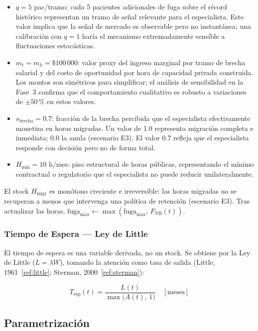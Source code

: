 \documentclass[12pt,a4paper]{article}
\begin{document}
\begin{itemize}[leftmargin=1.5cm]
  \item $q = 5$ pac/tramo: cada 5 pacientes adicionales de fuga sobre el récord histórico representan un tramo de señal relevante para el especialista. Este valor implica que la señal de mercado es observable pero no instantánea; una calibración con $q=1$ haría el mecanismo extremadamente sensible a fluctuaciones estocásticas.
  \item $m_t = m_h = \$100\,000$: valor proxy del ingreso marginal por tramo de brecha salarial y del costo de oportunidad por hora de capacidad privada construida. Los montos son simétricos para simplificar; el análisis de sensibilidad en la Fase~3 confirma que el comportamiento cualitativo es robusto a variaciones de $\pm 50$\,\% en estos valores.
  \item $s_{\text{brecha}} = 0.7$: fracción de la brecha percibida que el especialista efectivamente monetiza en horas migradas. Un valor de 1.0 representa migración completa e inmediata; 0.0 la anula (escenario E3). El valor 0.7 refleja que el especialista responde con decisión pero no de forma total.
  \item $H_{\min} = 10$ h/mes: piso estructural de horas públicas, representando el mínimo contractual o regulatorio que el especialista no puede reducir unilateralmente.
\end{itemize}

El stock $H_{\text{migr}}$ es monótono creciente e irreversible: las horas migradas no se recuperan a menos que intervenga una política de retención (escenario E3). Tras actualizar las horas, $\text{fuga}_{\max} \leftarrow \max(\text{fuga}_{\max},\,F_{\text{NB}}(t))$.

\subsubsection*{Tiempo de Espera — Ley de Little}

El tiempo de espera es una variable derivada, no un stock. Se obtiene por la Ley de Little ($L = \lambda W$), tomando la atención como tasa de salida (Little, 1961~\ref{ref:little}; Sterman, 2000~\ref{ref:sterman}):

\begin{equation}
  T_{\text{esp}}(t) = \frac{L(t)}{\max\!\bigl(A(t),\,1\bigr)} \quad [\text{meses}]
  \label{eq:little}
\end{equation}

\subsection{Parametrización}
\end{document}
